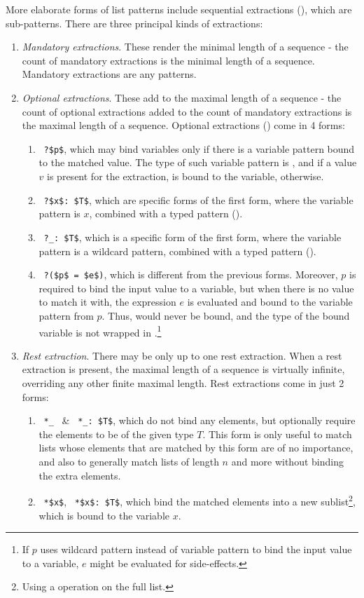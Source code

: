 More elaborate forms of list patterns include sequential extractions (), which are sub-patterns. There are three principal kinds of extractions:
\begin{enumerate}
  \item {\em Mandatory extractions}. These render the minimal length of a sequence - the count of mandatory extractions is the minimal length of a sequence. Mandatory extractions are any patterns. 
  \item {\em Optional extractions}. These add to the maximal length of a sequence - the count of optional extractions added to the count of mandatory extractions is the maximal length of a sequence. Optional extractions () come in 4 forms:
    \begin{enumerate}
      \item ~\lstinline!?$p$!, which may bind variables only if there is a variable pattern bound to the matched value. The type of such variable pattern is , and if a value $v$ is present for the extraction,  is bound to the variable,  otherwise. 
      \item ~\lstinline!?$x$: $T$!, which are specific forms of the first form, where the variable pattern is $x$, combined with a typed pattern (). 
      \item ~\lstinline!?_: $T$!, which is a specific form of the first form, where the variable pattern is a wildcard pattern, combined with a typed pattern (). 
      \item ~\lstinline!?($p$ = $e$)!, which is different from the previous forms. Moreover, $p$ is required to bind the input value to a variable, but when there is no value to match it with, the expression $e$ is evaluated and bound to the variable pattern from $p$. Thus,  would never be bound, and the type of the bound variable is not wrapped in .\footnote{If $p$ uses wildcard pattern instead of variable pattern to bind the input value to a variable, $e$ might be evaluated for side-effects.} 
    \end{enumerate}
  \item {\em Rest extraction}. There may be only up to one rest extraction. When a rest extraction is present, the maximal length of a sequence is virtually infinite, overriding any other finite maximal length. Rest extractions come in just 2 forms:
    \begin{enumerate}
      \item ~\lstinline!*_!~ \& ~\lstinline!*_: $T$!, which do not bind any elements, but optionally require the elements to be of the given type $T$. This form is only useful to match lists whose elements that are matched by this form are of no importance, and also to generally match lists of length $n$ and more without binding the extra elements. 
      \item ~\lstinline!*$x$!, ~\lstinline!*$x$: $T$!, which bind the matched elements into a new sublist\footnote{Using a  operation on the full list.}, which is bound to the variable $x$. 
    \end{enumerate}
\end{enumerate}


